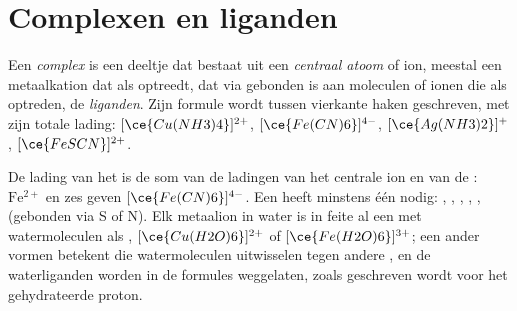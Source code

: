 \section{Complexen en liganden}

\begin{definition}\label{def:b1:complexation:complex}
Een \emph{complex} is een deeltje dat bestaat uit een
\emph{centraal atoom} of ion, meestal een
metaalkation dat als  optreedt, dat via 
gebonden is aan moleculen of ionen die als  optreden, de
\emph{liganden}. Zijn formule wordt tussen vierkante haken
geschreven, met zijn totale lading: $[\ce{Cu(NH3)4}]^{2+}$,
$[\ce{Fe(CN)6}]^{4-}$, $[\ce{Ag(NH3)2}]^{+}$, $[\ce{FeSCN}]^{2+}$.
\end{definition}

De lading van het  is de som van de ladingen van het centrale ion
en van de : $\mathrm{Fe^{2+}}$ en zes  geven
$[\ce{Fe(CN)6}]^{4-}$. Een  heeft minstens één 
nodig: , , , , , 
(gebonden via S of N). Elk metaalion in water is in feite al een 
met watermoleculen als , $[\ce{Cu(H2O)6}]^{2+}$ of
$[\ce{Fe(H2O)6}]^{3+}$; een ander  vormen betekent die
watermoleculen uitwisselen tegen andere , en de waterliganden
worden in de formules weggelaten, zoals  geschreven wordt voor
het gehydrateerde proton.

